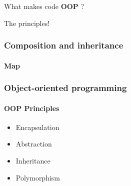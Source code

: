 \begin{frame}[c]
    \begin{center}
        \Huge What \pause makes \pause code \pause \textbf{OOP} ?
    \end{center}
\end{frame}

\begin{frame}[c]
    \begin{center}
        \Huge The principles!
    \end{center}
\end{frame}

\begin{frame}[fragile,c]
    \frametitle{Composition and inheritance}
    \framesubtitle{Map}

\end{frame}

\begin{frame}
    \frametitle{Object-oriented programming}
    \framesubtitle{OOP Principles}

    \begin{itemize}[<+->]
        \item Encapsulation
        \item Abstraction
        \item Inheritance
        \item Polymorphism
    \end{itemize}
\end{frame}

